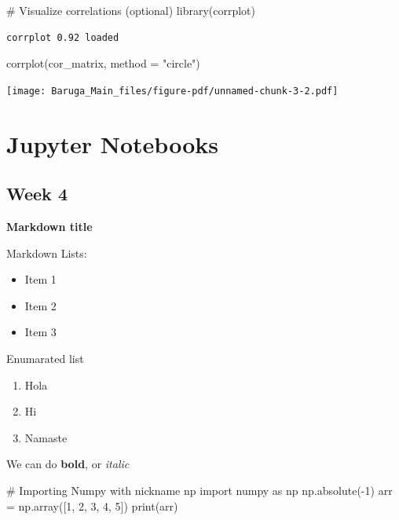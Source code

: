 \documentclass[
  letterpaper,
  DIV=11,
  numbers=noendperiod]{scrreprt}
\newenvironment{Shaded}{\begin{snugshade}}{\end{snugshade}}
\newcommand{\AttributeTok}[1]{\textcolor[rgb]{0.40,0.45,0.13}{#1}}
\newcommand{\BuiltInTok}[1]{\textcolor[rgb]{0.00,0.23,0.31}{#1}}
\newcommand{\CommentTok}[1]{\textcolor[rgb]{0.37,0.37,0.37}{#1}}
\newcommand{\DecValTok}[1]{\textcolor[rgb]{0.68,0.00,0.00}{#1}}
\newcommand{\FunctionTok}[1]{\textcolor[rgb]{0.28,0.35,0.67}{#1}}
\newcommand{\ImportTok}[1]{\textcolor[rgb]{0.00,0.46,0.62}{#1}}
\newcommand{\NormalTok}[1]{\textcolor[rgb]{0.00,0.23,0.31}{#1}}
\newcommand{\OperatorTok}[1]{\textcolor[rgb]{0.37,0.37,0.37}{#1}}
\newcommand{\StringTok}[1]{\textcolor[rgb]{0.13,0.47,0.30}{#1}}
\providecommand{\tightlist}{%
  \setlength{\itemsep}{0pt}\setlength{\parskip}{0pt}}\usepackage{longtable,booktabs,array}
\begin{document}
\begin{Shaded}
\begin{Highlighting}[]
\CommentTok{\# Visualize correlations (optional)}
\FunctionTok{library}\NormalTok{(corrplot)}
\end{Highlighting}
\end{Shaded}

\begin{verbatim}
corrplot 0.92 loaded
\end{verbatim}

\begin{Shaded}
\begin{Highlighting}[]
\FunctionTok{corrplot}\NormalTok{(cor\_matrix, }\AttributeTok{method =} \StringTok{"circle"}\NormalTok{)}
\end{Highlighting}
\end{Shaded}

\texttt{[image: Baruga\_Main\_files/figure-pdf/unnamed-chunk-3-2.pdf]}

\section{Jupyter Notebooks}\label{jupyter-notebooks-2}

\subsection{Week 4}\label{week-4-2}

\textbf{Markdown title}

Markdown Lists:

\begin{itemize}
\tightlist
\item
  Item 1
\item
  Item 2
\item
  Item 3
\end{itemize}

Enumarated list

\begin{enumerate}
\def\labelenumi{\arabic{enumi}.}
\tightlist
\item
  Hola
\item
  Hi
\item
  Namaste
\end{enumerate}

We can do \textbf{bold}, or \emph{italic}

\begin{Shaded}
\begin{Highlighting}[]
\CommentTok{\# Importing Numpy with nickname np}
\ImportTok{import}\NormalTok{ numpy }\ImportTok{as}\NormalTok{ np}
\NormalTok{np.absolute(}\OperatorTok{{-}}\DecValTok{1}\NormalTok{)}
\NormalTok{arr }\OperatorTok{=}\NormalTok{ np.array([}\DecValTok{1}\NormalTok{, }\DecValTok{2}\NormalTok{, }\DecValTok{3}\NormalTok{, }\DecValTok{4}\NormalTok{, }\DecValTok{5}\NormalTok{])}
\BuiltInTok{print}\NormalTok{(arr)}
\end{Highlighting}
\end{Shaded}
\end{document}
